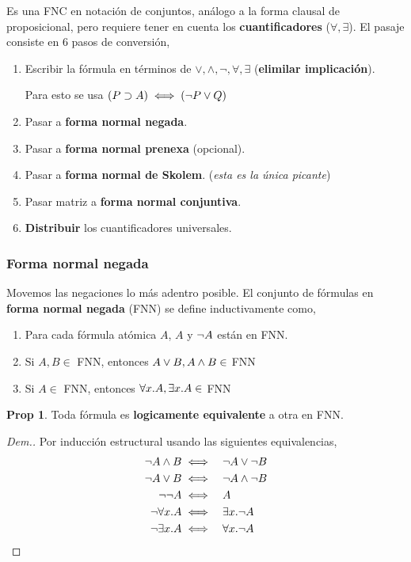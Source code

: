 \documentclass{report}
\theoremstyle{definition} %
\newtheorem*{proposition*}{Prop}
\begin{document}
Es una FNC en notación de conjuntos, análogo a la forma clausal de
proposicional, pero requiere tener en cuenta los \textbf{cuantificadores}
($\forall, \exists$). El pasaje consiste en 6 pasos de conversión,

\begin{enumerate}
    \item Escribir la fórmula en términos de $\vee, \wedge, \neg, \forall,
    \exists$ (\textbf{elimilar implicación}).

    Para esto se usa $(P \supset A) \iff (\neg P \vee Q)$

    \item Pasar a \textbf{forma normal negada}.
    \item Pasar a \textbf{forma normal prenexa} (opcional).
    \item Pasar a \textbf{forma normal de Skolem}. (\textit{esta es la única
    picante})
    \item Pasar matriz a \textbf{forma normal conjuntiva}.
    \item \textbf{Distribuir} los cuantificadores universales.
\end{enumerate}

\subsubsection{Forma normal negada}

Movemos las negaciones lo más adentro posible. El conjunto de fórmulas en
\textbf{forma normal negada} (FNN) se define inductivamente como,

\begin{enumerate}
    \item Para cada fórmula atómica $A$, $A$ y $\neg A$ están en FNN.
    \item Si $A, B \in$ FNN, entonces $A \vee B, A \wedge B \in$ FNN
    \item Si $A\in$ FNN, entonces $\forall x . A, \exists x . A \in$ FNN
\end{enumerate}

\begin{proposition*}
    Toda fórmula es \textbf{logicamente equivalente} a otra en FNN.
\end{proposition*}
\begin{proof}[Dem.]
    Por inducción estructural usando las siguientes equivalencias,
    \begin{alignat*}{2}
        \neg A \wedge B &\iff &&\neg A \vee \neg B\\
        \neg A \vee B &\iff &&\neg A \wedge \neg B\\
        \neg \neg A &\iff &&A\\
        \neg \forall x . A &\iff &&\exists x . \neg A\\
        \neg \exists x . A &\iff &&\forall x . \neg A
    \end{alignat*}
\end{proof}
\end{document}
